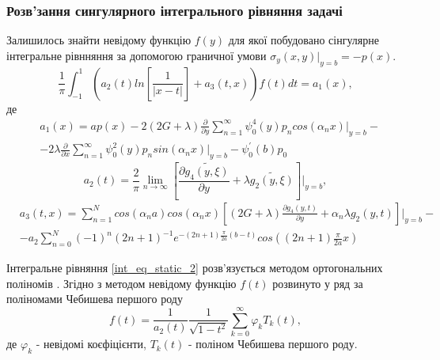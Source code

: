 \subsubsection{Розв'зання сингулярного інтегрального рівняння задачі}
Залишилось знайти невідому функцію $f(y)$ для якої побудовано сінгулярне інтегральне рівнняння за допомогою граничної умови $\sigma_y(x, y) |_{y=b} = -p(x)$.
\begin{equation}\label{int_eq_static_2}
    \frac{1}{\pi} \int_{-1}^{1} \left( a_2(t) ln\left[ \frac{1}{\lvert x - t \rvert} \right] + a_3(t, x) \right) f(t) dt = a_1(x),
\end{equation}
де
\begin{align*}
    &a_1(x) = a p(x) - 2(2G + \lambda) \frac{\partial}{\partial y} \sum_{n=1}^{\infty} \psi_0^{4}(y) p_n cos(\alpha_n x)|_{y=b} - \nonumber \\
    &- 2\lambda \frac{\partial}{\partial x} \sum_{n=1}^{\infty}\psi_0^2(y) p_n sin(\alpha_n x)|_{y=b} - \psi_0^{'}(b) p_0
\end{align*}
\begin{equation*}
    a_2(t) = \frac{2}{\pi} \lim_{n \rightarrow \infty}\left[ \frac{\partial \widetilde{g_4(y, \xi)}}{\partial y} + \lambda \widetilde{g_2(y, \xi)} \right]|_{y=b}, 
\end{equation*}
\begin{align*}
    &a_3(t, x) = \sum_{n=1}^{N} cos(\alpha_n a) cos(\alpha_n x) \left[(2G + \lambda) \frac{\partial g_4(y, t)}{\partial y} + \alpha_n \lambda g_2(y, t) \right]|_{y=b} - \\
    & - a_2 \sum_{n=0}^{N} (-1)^n (2n + 1)^{-1} e^{-(2n + 1) \frac{\pi}{2a} (b - t)} cos((2n + 1) \frac{\pi}{2a} x)
\end{align*}

Інтегральне рівняння \eqref{int_eq_static_2} розв'язується методом ортогональних поліномів \cite{popov_3}.
Згідно з методом невідому функцію $f(t)$ розвинуто у ряд за поліномами Чебишева першого роду
\begin{equation}\label{unk_fun_static_2}
    f(t) = \frac{1}{a_2(t)} \frac{1}{\sqrt{1 - t^2}} \sum_{k=0}^{\infty} \varphi_k T_{k}(t),
\end{equation}
де $\varphi_k$ - невідомі коєфіцієнти, $T_{k}(t)$ - поліном Чебишева першого роду.


